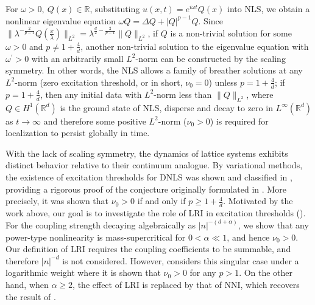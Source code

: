 \documentclass{article}
\numberwithin{equation}{section}
\begin{document}
For $\omega > 0,\ Q(x) \in \mathbb{R}$, substituting $u(x,t) = e^{i \omega t}Q(x)$ into NLS, we obtain a nonlinear eigenvalue equation $\omega Q = \Delta Q + |Q|^{p-1} Q$. Since $\| \lambda^{-\frac{2}{p-1}} Q(\frac{x}{\lambda}) \|_{L^2} = \lambda^{\frac{d}{2} - \frac{2}{p-1}} \| Q \|_{L^2}$, if $Q$ is a non-trivial solution for some $\omega > 0$ and $p \neq 1 + \frac{4}{d}$, another non-trivial solution to the eigenvalue equation with $\omega^\prime>0$ with an arbitrarily small $L^2$-norm can be constructed by the scaling symmetry. In other words, the NLS allows a family of breather solutions at any $L^2$-norm (zero excitation threshold, or in short, $\nu_0 = 0$) unless $p = 1 + \frac{4}{d}$; if $p = 1 + \frac{4}{d}$, then any initial data with $L^2$-norm less than $\| Q \|_{L^2}$, where $Q \in H^1(\mathbb{R}^d)$ is the ground state of NLS, disperse and decay to zero in $L^\infty(\mathbb{R}^d)$ as $t \rightarrow \infty$ \cite{cmp/1103922134} and therefore some positive $L^2$-norm ($\nu_0 > 0$) is required for localization to persist globally in time.

With the lack of scaling symmetry, the dynamics of lattice systems exhibits distinct behavior relative to their continuum analogue. By variational methods, the existence of excitation thresholds for DNLS was shown and classified in \cite{weinstein1999excitation}, providing a rigorous proof of the conjecture originally formulated in \cite{flach1997energy}. More precisely, it was shown that $\nu_0 > 0$ if and only if $p \geq 1 + \frac{4}{d}$. Motivated by the work above, our goal is to investigate the role of LRI in excitation thresholds (). For the coupling strength decaying algebraically as $|n|^{-(d+\alpha)}$, we show that any power-type nonlinearity is mass-supercritical for $0 < \alpha \ll 1$, and hence $\nu_0 > 0$. Our definition of LRI requires the coupling coefficients to be summable, and therefore $|n|^{-d}$ is not considered. However,  considers this singular case under a logarithmic weight where it is shown that $\nu_0 > 0$ for any $p>1$. On the other hand, when $\alpha \geq 2$, the effect of LRI is replaced by that of NNI, which recovers the result of \cite{weinstein1999excitation}.
\end{document}
